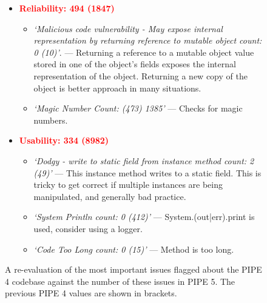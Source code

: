 \begin{figure}[ptb]
\begin{framed}
\begin{itemize}
    \item \textcolor{red}{\textbf{Reliability: 494 (1847)}}
    \begin{itemize}
        \item \textit{`Malicious code vulnerability - May expose internal representation by returning reference to mutable object count: 0 (10)'}. --- Returning a reference to a mutable object value stored in one of the object's fields exposes the internal representation of the object. Returning a new copy of the object is better approach in many situations.
        \item \textit{`Magic Number Count: (473) 1385'} --- Checks for magic numbers.
    \end{itemize}

    \item \textcolor{red}{\textbf{Usability: 334 (8982)}}
    \begin{itemize}
        \item \textit{`Dodgy - write to static field from instance method count: 2 (49)'} --- This instance method writes to a static field. This is tricky to get correct if multiple instances are being manipulated, and generally bad practice. 
        \item \textit{`System Println count: 0 (412)'} --- System.(out|err).print is used, consider using a logger.
        \item \textit{`Code Too Long count: 0 (15)'} --- Method is too long.

    \end{itemize}
\end{itemize} 
\end{framed}
\caption{A re-evaluation of the most important issues flagged about the PIPE 4 codebase against the number of these issues in PIPE 5. The previous PIPE 4 values are shown in brackets.}
\label{fig:eval_qaplug}
\end{figure}
